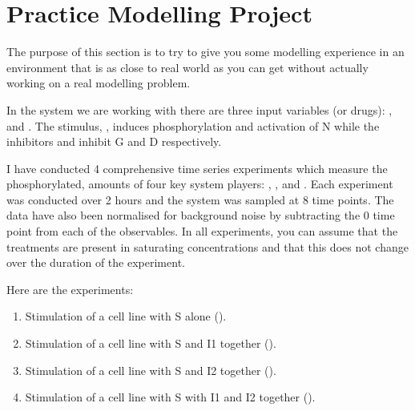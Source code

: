 \documentclass[../../main]{subfiles}
\begin{document}
    \section{Practice Modelling Project}
    The purpose of this section is to try to give you some modelling experience in an environment
    that is as close to real world as you can get without actually working on a
    real modelling problem.

    In the system we are working with there are three input variables (or drugs): ,  and .
    The stimulus, , induces phosphorylation and activation of N while the inhibitors 
    and  inhibit G and D respectively.

    I have conducted 4 comprehensive time series experiments which measure the phosphorylated,
    amounts of four key system players: , ,  and . Each experiment was
    conducted over 2 hours and the system was sampled at 8 time points.
    The data have also been normalised for background noise by subtracting the 0 time point
    from each of the observables. In all experiments, you can assume that the treatments
    are present in saturating concentrations and that this does not change over the
    duration of the experiment.

    Here are the experiments:
    \begin{enumerate}
        \item Stimulation of a cell line with S alone ().
        \item Stimulation of a cell line with S and I1 together ().
        \item Stimulation of a cell line with S and I2 together ().
        \item Stimulation of a cell line with S with I1 and I2 together ().
    \end{enumerate}
\end{document}
